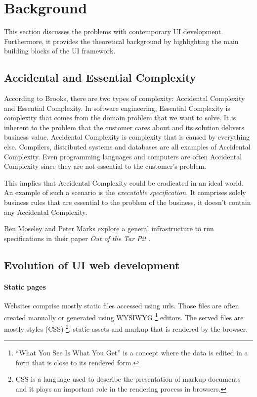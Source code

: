 \section{Background}\label{background}
This section discusses the problems with contemporary UI development. Furthermore, it provides the theoretical background by highlighting the main building blocks of the UI framework.

\subsection{Accidental and Essential Complexity}
According to Brooks, there are two types of complexity: Accidental Complexity and Essential Complexity. \citep{nosilverbullet}
In software engineering, Essential Complexity is complexity that comes from the domain problem that we want to solve. It is inherent to the problem that the customer cares about and its solution delivers business value. Accidental Complexity is complexity that is caused by everything else. Compilers, distributed systems and databases are all examples of Accidental Complexity. Even programming languages and computers are often Accidental Complexity since they are not essential to the customer's problem.

This implies that Accidental Complexity could be eradicated in an ideal world. An example of such a scenario is the \textit{executable specification}. It comprises solely business rules that are essential to the problem of the business, it doesn't contain any Accidental Complexity.

Ben Moseley and Peter Marks explore a general infrastructure to run specifications in their paper \textit{Out of the Tar Pit} \citep{outoftarpit}.

\subsection{Evolution of UI web development}\label{history}

\paragraph{Static pages} Websites comprise mostly static files accessed using \gls{url}s. Those files are often created manually or generated using WYSIWYG \footnote{``What You See Is What You Get'' is a concept where the data is edited in a form that is close to its rendered form.} editors. The served files are mostly styles (CSS) \footnote{CSS is a language used to describe the presentation of markup documents and it plays an important role in the rendering process in browsers.}, static assets and markup that is rendered by the browser.


